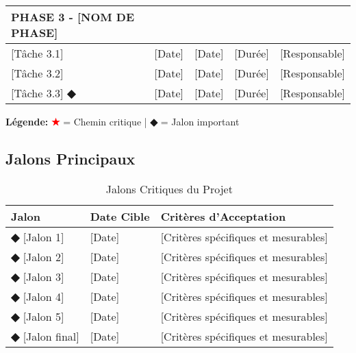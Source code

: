 \begin{longtable}{|p{}|p{}|p{}|p{}|p{}|}
\rowcolor{DollaramaGreen!20}
\textbf{\color{DollaramaGreen}PHASE 3 - [NOM DE PHASE]} & & & & \\
\hline
\hspace{1em}[Tâche 3.1] & [Date] & [Date] & [Durée] & [Responsable] \\
\hline
\rowcolor{gray!10}
\hspace{1em}[Tâche 3.2] & [Date] & [Date] & [Durée] & [Responsable] \\
\hline
\hspace{1em}[Tâche 3.3] \textcolor{DollaramaGreen}{\textbf{◆}} & [Date] & [Date] & [Durée] & [Responsable] \\
\hline
\end{longtable}

\textbf{Légende:} \textcolor{red}{\textbf{★}} = Chemin critique | \textcolor{DollaramaGreen}{\textbf{◆}} = Jalon important

\subsection{Jalons Principaux}

\begin{table}[H]
\centering
\caption{Jalons Critiques du Projet}
\label{tab:milestones}
\begin{tabular}{|p{}|p{}|p{}|}
\hline
\rowcolor{DollaramaGreen!30}
\textbf{\color{white}Jalon} & 
\textbf{\color{white}Date Cible} & 
\textbf{\color{white}Critères d'Acceptation} \\
\hline
\textcolor{DollaramaGreen}{\textbf{◆}} [Jalon 1] & [Date] & [Critères spécifiques et mesurables] \\
\hline
\rowcolor{gray!10}
\textcolor{DollaramaGreen}{\textbf{◆}} [Jalon 2] & [Date] & [Critères spécifiques et mesurables] \\
\hline
\textcolor{DollaramaGreen}{\textbf{◆}} [Jalon 3] & [Date] & [Critères spécifiques et mesurables] \\
\hline
\rowcolor{gray!10}
\textcolor{DollaramaGreen}{\textbf{◆}} [Jalon 4] & [Date] & [Critères spécifiques et mesurables] \\
\hline
\textcolor{DollaramaGreen}{\textbf{◆}} [Jalon 5] & [Date] & [Critères spécifiques et mesurables] \\
\hline
\rowcolor{gray!10}
\textcolor{DollaramaGreen}{\textbf{◆}} [Jalon final] & [Date] & [Critères spécifiques et mesurables] \\
\hline
\end{tabular}
\end{table}

